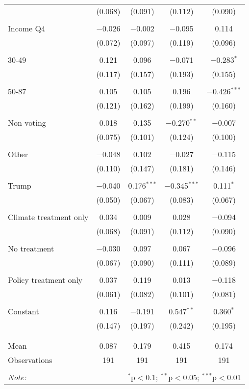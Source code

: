 \begin{tabular}{@{\extracolsep{5pt}}lcccc}
  & (0.068) & (0.091) & (0.112) & (0.090) \\ 
  & & & & \\ 
 Income Q4 & $-$0.026 & $-$0.002 & $-$0.095 & 0.114 \\ 
  & (0.072) & (0.097) & (0.119) & (0.096) \\ 
  & & & & \\ 
 30-49 & 0.121 & 0.096 & $-$0.071 & $-$0.283$^{*}$ \\ 
  & (0.117) & (0.157) & (0.193) & (0.155) \\ 
  & & & & \\ 
 50-87 & 0.105 & 0.105 & 0.196 & $-$0.426$^{***}$ \\ 
  & (0.121) & (0.162) & (0.199) & (0.160) \\ 
  & & & & \\ 
 Non voting & 0.018 & 0.135 & $-$0.270$^{**}$ & $-$0.007 \\ 
  & (0.075) & (0.101) & (0.124) & (0.100) \\ 
  & & & & \\ 
 Other & $-$0.048 & 0.102 & $-$0.027 & $-$0.115 \\ 
  & (0.110) & (0.147) & (0.181) & (0.146) \\ 
  & & & & \\ 
 Trump & $-$0.040 & 0.176$^{***}$ & $-$0.345$^{***}$ & 0.111$^{*}$ \\ 
  & (0.050) & (0.067) & (0.083) & (0.067) \\ 
  & & & & \\ 
 Climate treatment only & 0.034 & 0.009 & 0.028 & $-$0.094 \\ 
  & (0.068) & (0.091) & (0.112) & (0.090) \\ 
  & & & & \\ 
 No treatment & $-$0.030 & 0.097 & 0.067 & $-$0.096 \\ 
  & (0.067) & (0.090) & (0.111) & (0.089) \\ 
  & & & & \\ 
 Policy treatment only & 0.037 & 0.119 & 0.013 & $-$0.118 \\ 
  & (0.061) & (0.082) & (0.101) & (0.081) \\ 
  & & & & \\ 
 Constant & 0.116 & $-$0.191 & 0.547$^{**}$ & 0.360$^{*}$ \\ 
  & (0.147) & (0.197) & (0.242) & (0.195) \\ 
  & & & & \\ 
\hline \\[-1.8ex] 
Mean & 0.087 & 0.179 & 0.415 & 0.174 \\ 
Observations & 191 & 191 & 191 & 191 \\ 
\hline 
\hline \\[-1.8ex] 
\textit{Note:}  & \multicolumn{4}{r}{$^{*}$p$<$0.1; $^{**}$p$<$0.05; $^{***}$p$<$0.01} \\ 
\end{tabular} 
